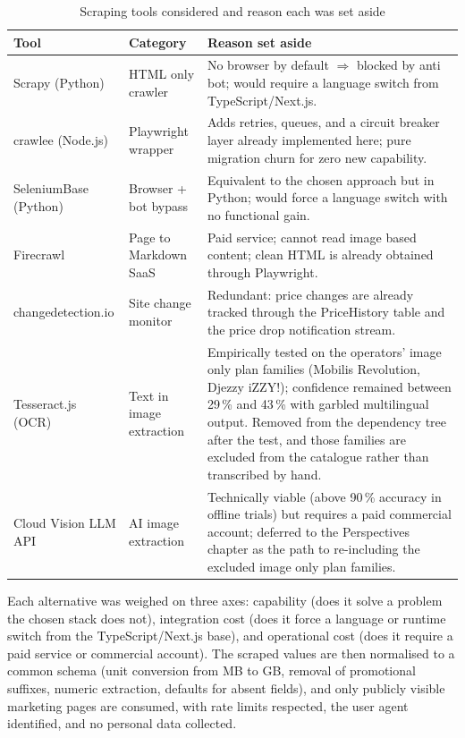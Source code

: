 \begin{table}[H]
  \caption{Scraping tools considered and reason each was set aside}
  \label{tab:scraping-tools}
  \centering\small
  \begin{tabular}{|p{2.9cm}|p{3.4cm}|p{8.0cm}|}
    \hline
    \textbf{Tool} & \textbf{Category} & \textbf{Reason set aside} \\
    \hline
    Scrapy (Python) & HTML only crawler & No browser by default $\Rightarrow$ blocked by anti bot; would require a language switch from TypeScript/Next.js. \\
    \hline
    crawlee (Node.js) & Playwright wrapper & Adds retries, queues, and a circuit breaker layer already implemented here; pure migration churn for zero new capability. \\
    \hline
    SeleniumBase (Python) & Browser + bot bypass & Equivalent to the chosen approach but in Python; would force a language switch with no functional gain. \\
    \hline
    Firecrawl & Page to Markdown SaaS & Paid service; cannot read image based content; clean HTML is already obtained through Playwright. \\
    \hline
    changedetection.io & Site change monitor & Redundant: price changes are already tracked through the PriceHistory table and the price drop notification stream. \\
    \hline
    Tesseract.js (OCR) & Text in image extraction & Empirically tested on the operators' image only plan families (Mobilis Revolution, Djezzy iZZY!); confidence remained between 29\,\% and 43\,\% with garbled multilingual output. Removed from the dependency tree after the test, and those families are excluded from the catalogue rather than transcribed by hand. \\
    \hline
    Cloud Vision LLM API & AI image extraction & Technically viable (above 90\,\% accuracy in offline trials) but requires a paid commercial account; deferred to the Perspectives chapter as the path to re-including the excluded image only plan families. \\
    \hline
  \end{tabular}
\end{table}

Each alternative was weighed on three axes: capability (does it solve a problem the chosen stack does not), integration cost (does it force a language or runtime switch from the TypeScript/Next.js base), and operational cost (does it require a paid service or commercial account). The scraped values are then normalised to a common schema (unit conversion from MB to GB, removal of promotional suffixes, numeric extraction, defaults for absent fields), and only publicly visible marketing pages are consumed, with rate limits respected, the user agent identified, and no personal data collected.

